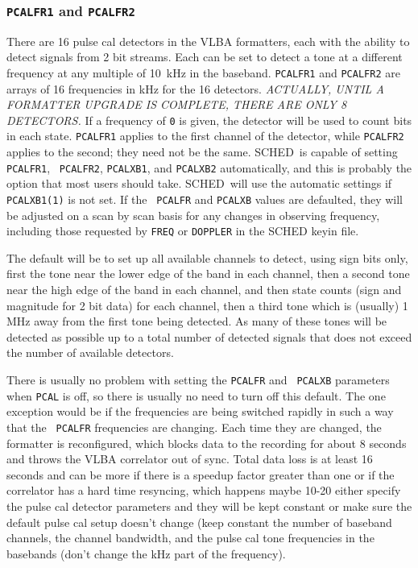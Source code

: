 \documentclass{report}
\newcommand{\schedb}{{\sc SCHED~}}
\begin{document}
\subsubsection{\label{SP:PCALFR1}{\tt PCALFR1} and {\tt PCALFR2}}

There are 16 pulse cal detectors in the VLBA formatters, each with the
ability to detect signals from 2 bit streams. Each can be set to
detect a tone at a different frequency at any multiple of 10~kHz in
the baseband. {\tt PCALFR1} and {\tt PCALFR2} are arrays of 16
frequencies in kHz for the 16 detectors. {\em ACTUALLY, UNTIL A
FORMATTER UPGRADE IS COMPLETE, THERE ARE ONLY 8 DETECTORS.} If a
frequency of {\tt 0} is given, the detector will be used to count bits
in each state. {\tt PCALFR1} applies to the first channel of the
detector, while {\tt PCALFR2} applies to the second; they need not be
the same. \schedb is capable of setting {\tt PCALFR1}, {\tt
PCALFR2}, {\tt PCALXB1}, and {\tt PCALXB2} automatically, and this is
probably the option that most users should take. \schedb will use
the automatic settings if {\tt PCALXB1(1)} is not set.  If the {\tt
PCALFR} and {\tt PCALXB} values are defaulted, they will be adjusted
on a scan by scan basis for any changes in observing frequency,
including those requested by {\tt FREQ} or {\tt DOPPLER} in the {\sc
SCHED} keyin file.

The default will be to set up all available channels to detect, using
sign bits only, first the tone near the lower edge of the band in each
channel, then a second tone near the high edge of the band in each
channel, and then state counts (sign and magnitude for 2 bit data) for
each channel, then a third tone which is (usually) 1 MHz away from the
first tone being detected.  As many of these tones will be detected as
possible up to a total number of detected signals that does not exceed
the number of available detectors.

There is usually no problem with setting the {\tt PCALFR} and {\tt
PCALXB} parameters when {\tt PCAL} is off, so there is usually no need
to turn off this default. The one exception would be if the
frequencies are being switched rapidly in such a way that the {\tt
PCALFR} frequencies are changing. Each time they are changed, the
formatter is reconfigured, which blocks data to the recording for
about 8 seconds and throws the VLBA correlator out of sync.  Total
data loss is at least 16 seconds and can be more if there is a speedup
factor greater than one or if the correlator has a hard time
resyncing, which happens maybe 10-20%
either specify the pulse cal detector parameters and they will be kept
constant or make sure the default pulse cal setup doesn't change (keep
constant the number of baseband channels, the channel bandwidth, and
the pulse cal tone frequencies in the basebands (don't change the kHz
part of the frequency).
\end{document}
